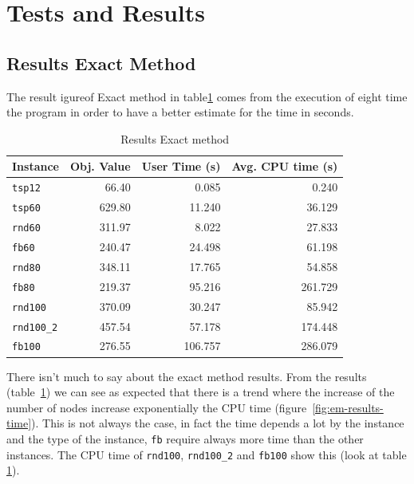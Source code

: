 \section{Tests and Results}

\subsection{Results Exact Method}
	The result igureof Exact method in table\ref{tab:ExactMethodResults} comes from the execution of eight time the program in order to have a better estimate for the time in seconds.

	\begin{table}[h]
		\centering
		\begin{tabular}{lrrr}
			\toprule
			\textbf{Instance} & \textbf{Obj. Value} & \textbf{User Time (s)} & \textbf{Avg. CPU time (s)} \\
			\midrule
			\verb|tsp12| & 66.40 & 0.085 & 0.240 \\
			\verb|tsp60| & 629.80 & 11.240 & 36.129 \\
			\verb|rnd60| & 311.97 & 8.022 & 27.833 \\
			\verb|fb60|	& 240.47 & 24.498 & 61.198 \\
			\verb|rnd80| & 348.11 & 17.765 & 54.858 \\
			\verb|fb80| & 219.37 & 95.216 & 261.729 \\
			\verb|rnd100| & 370.09 & 30.247 & 85.942 \\
			\verb|rnd100_2| & 457.54 & 57.178 & 174.448 \\
			\verb|fb100| & 276.55 & 106.757 & 286.079 \\
			\bottomrule
		\end{tabular}
		\caption{\label{tab:ExactMethodResults} Results Exact method}
	\end{table}

	There isn't much to say about the exact method results. From the results (table~\ref{tab:ExactMethodResults}) we can see as expected that there is a trend where the increase of the number of nodes increase exponentially the CPU time (figure~\ref{fig:em-results-time}). This is not always the case, in fact the time depends a lot by the instance and the type of the instance, \verb|fb| require always more time than the other instances. The CPU time of \verb|rnd100|, \verb|rnd100_2| and \verb|fb100| show this (look at table \ref{tab:ExactMethodResults}).

